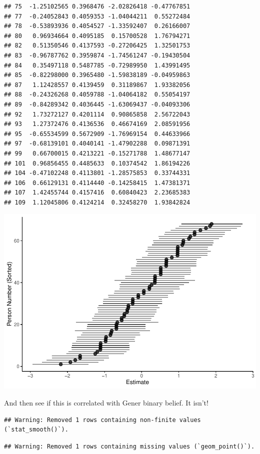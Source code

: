 \documentclass[
  man]{apa7}
\begin{document}
\begin{verbatim}
## 75  -1.25102565 0.3968476 -2.02826418 -0.47767851
## 77  -0.24052843 0.4059353 -1.04044211  0.55272484
## 78  -0.53893936 0.4054527 -1.33592407  0.26166007
## 80   0.96934664 0.4095185  0.15700528  1.76794271
## 82   0.51350546 0.4137593 -0.27206425  1.32501753
## 83  -0.96787762 0.3959874 -1.74561247 -0.19430504
## 84   0.35497118 0.5487785 -0.72989950  1.43991495
## 85  -0.82298000 0.3965480 -1.59838189 -0.04959863
## 87   1.12428557 0.4139459  0.31189867  1.93382056
## 88  -0.24326268 0.4059788 -1.04064182  0.55054197
## 89  -0.84289342 0.4036445 -1.63069437 -0.04093306
## 92   1.73272127 0.4201114  0.90865858  2.56722043
## 93   1.27372476 0.4136536  0.46674169  2.08591956
## 95  -0.65534599 0.5672909 -1.76969154  0.44633966
## 97  -0.68139101 0.4040141 -1.47902288  0.09871391
## 99   0.66700015 0.4213221 -0.15271788  1.48677147
## 101  0.96856455 0.4485633  0.10374542  1.86194226
## 104 -0.47102248 0.4113801 -1.28575853  0.33744331
## 106  0.66129131 0.4114440 -0.14258415  1.47381371
## 107  1.42455744 0.4157416  0.60840423  2.23685383
## 109  1.12045806 0.4124214  0.32458270  1.93842824
\end{verbatim}

\includegraphics{resp_opts_manus23022_files/figure-latex/unnamed-chunk-10-1.pdf}

And then see if this is correlated with Gener binary belief. It isn't!

\begin{verbatim}
## Warning: Removed 1 rows containing non-finite values (`stat_smooth()`).
\end{verbatim}

\begin{verbatim}
## Warning: Removed 1 rows containing missing values (`geom_point()`).
\end{verbatim}
\end{document}
